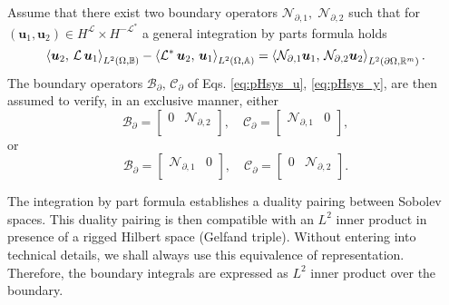 \begin{assumption}\label{ass:operBC}
	Assume that there exist  two boundary operators $\mathcal{N}_{\partial, 1}, \; \mathcal{N}_{\partial, 2}$ such that for $(\bm{u}_1, \bm{u}_2) \in H^\mathcal{L} \times H^\mathcal{-L^*}$ a general integration by parts formula holds
	\begin{equation}\label{eq:intbypartsJ} 
	\inner[L^2(\Omega, \mathbb{B})]{\bm{u}_2}{\mathcal{L}\,\bm{u}_1} - \inner[L^2(\Omega, \mathbb{A})]{\mathcal{L}^* \, \bm{u}_2}{\bm{u}_1} = \inner[L^2(\partial \Omega, \mathbb{R}^m)]{\mathcal{N}_{\partial, 1} \bm{u}_1}{\mathcal{N}_{\partial, 2} \bm{u}_2}. 
	\end{equation}
	The boundary operators $\mathcal{B}_\partial, \, \mathcal{C}_\partial$ of Eqs. \eqref{eq:pHsys_u}, \eqref{eq:pHsys_y}, are then assumed to verify, in an exclusive manner, either
	\begin{equation}\label{eq:assB2C1}
	\mathcal{B}_\partial = \begin{bmatrix}
	0 & \mathcal{N}_{\partial, 2} \\
	\end{bmatrix}, \quad 
	\mathcal{C}_\partial = \begin{bmatrix}
	\mathcal{N}_{\partial, 1} & 0 \\
	\end{bmatrix},
	\end{equation}
	or 
	\begin{equation}\label{eq:assB1C2}
	\mathcal{B}_\partial = \begin{bmatrix}
	\mathcal{N}_{\partial, 1} & 0 \\
	\end{bmatrix}, \quad \mathcal{C}_\partial = \begin{bmatrix}
	0 & \mathcal{N}_{\partial, 2} \\
	\end{bmatrix}.
	\end{equation}

\end{assumption}

\begin{remark}
	The integration by part formula establishes a duality pairing between Sobolev spaces. This duality pairing is then compatible with an $L^2$ inner product in presence of a rigged Hilbert space (Gelfand triple). Without entering into technical details, we shall always use this equivalence of representation. Therefore, the boundary integrals are  expressed as $L^2$ inner product over the boundary. 
\end{remark}


